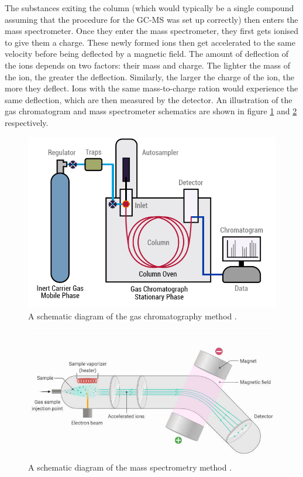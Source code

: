 The substances exiting the column (which would typically be a single compound assuming that the procedure for the GC-MS was set up correctly) then enters the mass spectrometer. Once they enter the mass spectrometer, they first gets ionised to give them a charge. These newly formed ions then get accelerated to the same velocity before being deflected by a magnetic field. The amount of deflection of the ions depends on two factors: their mass and charge. The lighter the mass of the ion, the greater the deflection. Similarly, the larger the charge of the ion, the more they deflect. Ions with the same mass-to-charge ration would experience the same deflection, which are then measured by the detector. An illustration of the gas chromatogram and mass spectrometer schematics are shown in figure \ref{fig:GC-schematic} and \ref{fig:MS-schematic} respectively. \\

\begin{figure}[h!]
	\centering
    \includegraphics[width=0.8\linewidth]{chapter_6/figures/GC-schematic.png} 
	\caption{A schematic diagram of the gas chromatography method \cite{PerkinElmer2022}.}
	\label{fig:GC-schematic}
\end{figure} 

\begin{figure}[h!]
	\centering
    \includegraphics[width=\linewidth]{chapter_6/figures/MS-schematic.jpeg} 
	\caption{A schematic diagram of the mass spectrometry method \cite{Aryal2022}.}
	\label{fig:MS-schematic}
\end{figure} 

